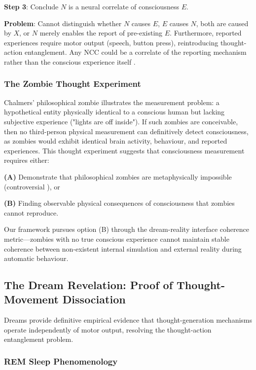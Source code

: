 \documentclass[11pt,onecolumn]{article}
\begin{document}
\textbf{Step 3}: Conclude $N$ is a neural correlate of consciousness $E$.

\textbf{Problem}: Cannot distinguish whether $N$ causes $E$, $E$ causes $N$, both are caused by $X$, or $N$ merely enables the report of pre-existing $E$. Furthermore, reported experiences require motor output (speech, button press), reintroducing thought-action entanglement. Any NCC could be a correlate of the reporting mechanism rather than the conscious experience itself \citep{block2007consciousness}.

\subsubsection{The Zombie Thought Experiment}

Chalmers' philosophical zombie \citep{chalmers1996conscious} illustrates the measurement problem: a hypothetical entity physically identical to a conscious human but lacking subjective experience ("lights are off inside"). If such zombies are conceivable, then no third-person physical measurement can definitively detect consciousness, as zombies would exhibit identical brain activity, behaviour, and reported experiences. This thought experiment suggests that consciousness measurement requires either:

\textbf{(A)} Demonstrate that philosophical zombies are metaphysically impossible (controversial \citep{kirk2019zombies}), or

\textbf{(B)} Finding observable physical consequences of consciousness that zombies cannot reproduce.

Our framework pursues option (B) through the dream-reality interface coherence metric---zombies with no true conscious experience cannot maintain stable coherence between non-existent internal simulation and external reality during automatic behaviour.

\subsection{The Dream Revelation: Proof of Thought-Movement Dissociation}

Dreams provide definitive empirical evidence that thought-generation mechanisms operate independently of motor output, resolving the thought-action entanglement problem.

\subsubsection{REM Sleep Phenomenology}
\end{document}
